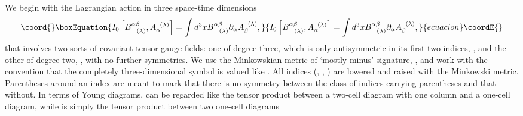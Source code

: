 \documentclass[a4paper,11pt]{article}
\begin{document}
We begin with the Lagrangian action in three space-time dimensions
\begin{equation}\coord{}\boxEquation{
I_{0}\left[ B_{\;\;\;(\lambda )}^{\alpha \beta },A_{\alpha }^{\;\;(\lambda
)}\right] =\int d^{3}xB_{\;\;\;(\lambda )}^{\alpha \beta }\partial _{\alpha
}A_{\beta }^{\;\;(\lambda )},  \label{bf31}
}{
I_{0}\left[ B_{\;\;\;(\lambda )}^{\alpha \beta },A_{\alpha }^{\;\;(\lambda
)}\right] =\int d^{3}xB_{\;\;\;(\lambda )}^{\alpha \beta }\partial _{\alpha
}A_{\beta }^{\;\;(\lambda )},  }{ecuacion}\coordE{}\end{equation}
that involves two sorts of covariant tensor gauge fields: one of degree
three, which is only antisymmetric in its first two indices, \coordHE{},
and the other of degree two, \coordHE{}, with no further
symmetries. We use the Minkowskian metric of `mostly minus' signature, \myHighlight{$%
\left( +,-,-\right) $}\coordHE{}, and work with the convention that the completely
three-dimensional symbol \myHighlight{$\varepsilon ^{\alpha \beta \gamma }$}\coordHE{} is valued
like \coordHE{}. All indices (\myHighlight{$\alpha $}\coordHE{}, \myHighlight{$\beta $}\coordHE{}, \myHighlight{$\lambda $}\coordHE{})
are lowered and raised with the Minkowski metric. Parentheses around an
index are meant to mark that there is no symmetry between the class of
indices carrying parentheses and that without. In terms of Young diagrams, \coordHE{} can be regarded like the tensor
product between a two-cell diagram with one column and a one-cell diagram,
while \coordHE{} is simply the tensor product between
two one-cell diagrams
\end{document}
